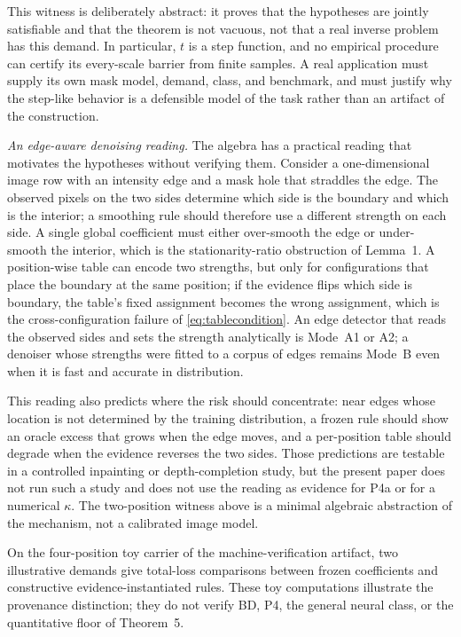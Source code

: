 \documentclass[twoside,11pt]{article}
\begin{document}
This witness is deliberately abstract: it proves that the hypotheses are jointly satisfiable and that the theorem is not vacuous, not that a real inverse problem has this demand. In particular, $t$ is a step function, and no empirical procedure can certify its every-scale barrier from finite samples. A real application must supply its own mask model, demand, class, and benchmark, and must justify why the step-like behavior is a defensible model of the task rather than an artifact of the construction.

\emph{An edge-aware denoising reading.}
The algebra has a practical reading that motivates the hypotheses without verifying them. Consider a one-dimensional image row with an intensity edge and a mask hole that straddles the edge. The observed pixels on the two sides determine which side is the boundary and which is the interior; a smoothing rule should therefore use a different strength on each side. A single global coefficient must either over-smooth the edge or under-smooth the interior, which is the stationarity-ratio obstruction of Lemma~1. A position-wise table can encode two strengths, but only for configurations that place the boundary at the same position; if the evidence flips which side is boundary, the table's fixed assignment becomes the wrong assignment, which is the cross-configuration failure of \eqref{eq:tablecondition}. An edge detector that reads the observed sides and sets the strength analytically is Mode~A1 or A2; a denoiser whose strengths were fitted to a corpus of edges remains Mode~B even when it is fast and accurate in distribution.

This reading also predicts where the risk should concentrate: near edges whose location is not determined by the training distribution, a frozen rule should show an oracle excess that grows when the edge moves, and a per-position table should degrade when the evidence reverses the two sides. Those predictions are testable in a controlled inpainting or depth-completion study, but the present paper does not run such a study and does not use the reading as evidence for P4a or for a numerical $\kappa$. The two-position witness above is a minimal algebraic abstraction of the mechanism, not a calibrated image model.

On the four-position toy carrier of the machine-verification artifact, two illustrative demands give total-loss comparisons between frozen coefficients and constructive evidence-instantiated rules. These toy computations illustrate the provenance distinction; they do not verify BD, P4, the general neural class, or the quantitative floor of Theorem~5.
\end{document}
